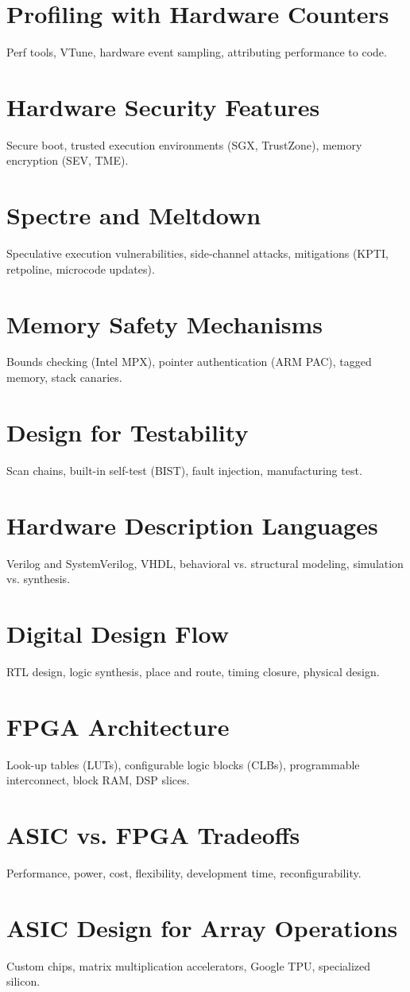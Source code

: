 \chapter{Profiling with Hardware Counters}
Perf tools, VTune, hardware event sampling, attributing performance to code.

\chapter{Hardware Security Features}
Secure boot, trusted execution environments (SGX, TrustZone), memory encryption (SEV, TME).

\chapter{Spectre and Meltdown}
Speculative execution vulnerabilities, side-channel attacks, mitigations (KPTI, retpoline, microcode updates).

\chapter{Memory Safety Mechanisms}
Bounds checking (Intel MPX), pointer authentication (ARM PAC), tagged memory, stack canaries.

\chapter{Design for Testability}
Scan chains, built-in self-test (BIST), fault injection, manufacturing test.

\chapter{Hardware Description Languages}
Verilog and SystemVerilog, VHDL, behavioral vs. structural modeling, simulation vs. synthesis.

\chapter{Digital Design Flow}
RTL design, logic synthesis, place and route, timing closure, physical design.

\chapter{FPGA Architecture}
Look-up tables (LUTs), configurable logic blocks (CLBs), programmable interconnect, block RAM, DSP slices.

\chapter{ASIC vs. FPGA Tradeoffs}
Performance, power, cost, flexibility, development time, reconfigurability.

\chapter{ASIC Design for Array Operations}
Custom chips, matrix multiplication accelerators, Google TPU, specialized silicon.